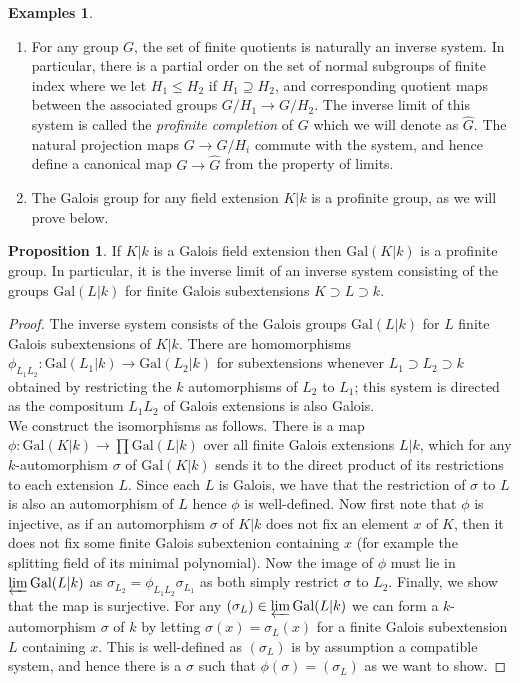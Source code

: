 \documentclass{article}
\theoremstyle{definition}
\newtheorem{proposition}[theorem]{Proposition}
\newtheorem{examples}[theorem]{Examples}
\theoremstyle{remark}
\begin{document}
\begin{examples} \text{}
\begin{enumerate}
	\item For any group $G$, the set of finite quotients is naturally an inverse system.
		In particular, there is a partial order on the set of normal subgroups of finite index where we let $H_1 \leq H_2$ if $H_1 \supseteq H_2$, and corresponding quotient maps between the associated groups $G/H_1 \to G/H_2$.
		The inverse limit of this system is called the \textit{profinite completion} of $G$ which we will denote as $\widehat{G}$.	
		The natural projection maps $G \to G/H_i$ commute with the system, and hence define a canonical map $G \to \widehat{G}$ from the property of limits.
	\item The Galois group for any field extension $K|k$ is a profinite group, as we will prove below.
		\end{enumerate}
\end{examples}


\begin{proposition}
	If $K|k$ is a Galois field extension then $\text{Gal}(K|k)$ is a profinite group.
	In particular, it is the inverse limit of an inverse system consisting of the groups $\text{Gal}(L|k)$ for finite Galois subextensions $K \supset L \supset k$.
\end{proposition}
\begin{proof}
	The inverse system consists of the Galois groups $\text{Gal}(L|k)$ for $L$ finite Galois subextensions of $K|k$.
	There are homomorphisms $\phi_{L_1L_2}: \text{Gal}(L_1|k) \to \text{Gal}(L_2|k)$ for subextensions whenever $L_1 \supset L_2 \supset k$ obtained by restricting the $k$ automorphisms of $L_2$ to $L_1$; this system is directed as the compositum $L_1 L_2$ of Galois extensions is also Galois.\\
\indent We construct the isomorphisms as follows.
There is a map $\phi: \text{Gal}(K|k) \to \prod \text{Gal}(L|k)$ over all finite Galois extensions $L|k$, which for any $k$-automorphism $\sigma$ of $\text{Gal}(K|k)$ sends it to the direct product of its restrictions to each extension $L$.
Since each $L$ is Galois, we have that the restriction of $\sigma$ to $L$ is also an automorphism of $L$ hence $\phi$ is well-defined.
Now first note that $\phi$ is injective, as if an automorphism $\sigma$ of $K|k$ does not fix an element $x$ of $K$, then it does not fix some finite Galois subextenion containing $x$ (for example the splitting field of its minimal polynomial).
Now the image of $\phi$ must lie in $\varprojlim \text{Gal}(L|k)$ as  $\sigma_{L_2} = \phi_{L_1 L_2} \sigma_{L_1}$ as both simply restrict $\sigma$ to $L_2$.
Finally, we show that the map is surjective.
For any $(\sigma_L) \in \varprojlim \text{Gal}(L|k)$ we can form a $k$-automorphism  $\sigma$ of $k$ by letting $\sigma(x) = \sigma_L(x)$ for a finite Galois subextension $L$ containing $x$. 
This is well-defined as $(\sigma_L)$ is by assumption a compatible system, and hence there is a $\sigma$ such that $\phi(\sigma) = (\sigma_L)$ as we want to show.
\end{proof}
\end{document}
